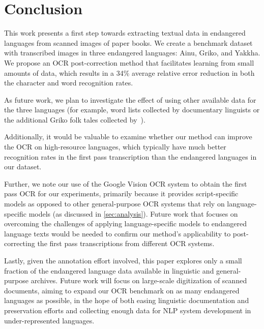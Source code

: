\section{Conclusion}
This work presents a first step towards extracting textual data in endangered languages from scanned images of paper books. We create a benchmark dataset with transcribed images in three endangered languages: Ainu, Griko, and Yakkha. We propose an OCR post-correction method that facilitates learning from small amounts of data, which results in a 34\% average relative error reduction in both the character and word recognition rates.

As future work, we plan to investigate the effect of using other available data for the three languages (for example, word lists collected by documentary linguists or the additional Griko folk tales collected by~\citet{anastasopoulos-etal-2018-part}). 

Additionally, it would be valuable to examine whether our method can improve the OCR on high-resource languages, which typically have much better recognition rates in the first pass transcription than the endangered languages in our dataset.

Further, we note our use of the Google Vision OCR system to obtain the first pass OCR for our experiments, primarily because it provides script-specific models as opposed to other general-purpose OCR systems that rely on language-specific models (as discussed in \autoref{sec:analysis}). Future work that focuses on overcoming the challenges of applying language-specific models to endangered language texts would be needed to confirm our method's applicability to post-correcting the first pass transcriptions from different OCR systems.

Lastly, given the annotation effort involved, this paper explores only a small fraction of the endangered language data available in linguistic and general-purpose archives.
Future work will focus on large-scale digitization of scanned documents, aiming to expand our OCR benchmark on as many endangered languages as possible, in the hope of both easing linguistic documentation and preservation efforts and collecting enough data for NLP system development in under-represented languages.
